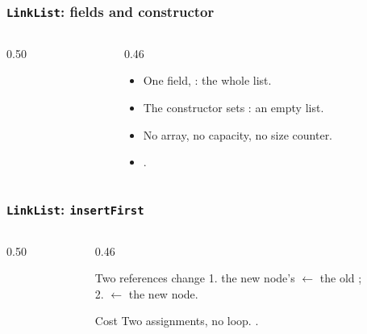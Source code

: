 \documentclass[aspectratio=169,10pt,compress]{beamer}
\begin{document}
\begin{frame}[t,fragile] \frametitle{\texttt{LinkList}: fields and constructor}
  \begin{columns}[T]
    \begin{column}{0.50\textwidth}
    \end{column}
    \begin{column}{0.46\textwidth}
      \begin{itemize}\small
        \item One field, : the whole list.
        \item The constructor sets : an empty list.
        \item No array, no capacity, no size counter.
        \item {}.
      \end{itemize}
    \end{column}
  \end{columns}
\end{frame}




\begin{frame}[t,fragile] \frametitle{\texttt{LinkList}: \texttt{insertFirst}}
  \begin{columns}[T]
    \begin{column}{0.50\textwidth}
    \end{column}
    \begin{column}{0.46\textwidth}
      \begin{block}{Two references change}
        \small
        1. the new node's  $\gets$ the old ;\\
        2.  $\gets$ the new node.
      \end{block}
      \begin{block}{Cost}
        \small
        Two assignments, no loop. .
      \end{block}
    \end{column}
  \end{columns}
\end{frame}
\end{document}
